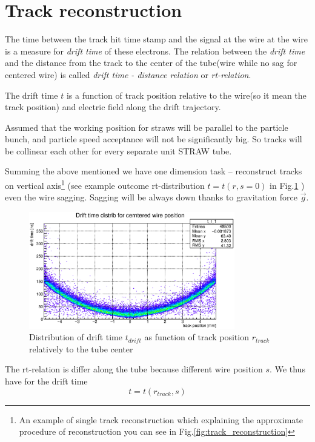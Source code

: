 \documentclass[]{article}
\begin{document}
	
	\section{Track reconstruction}
	
	 The time between the track hit time stamp and the signal at the wire at the wire is a measure for {\it drift time} of these electrons. The relation between the   {\it drift time} and  the distance from the track to the center of the tube(wire while no sag for centered wire) is called {\it drift time - distance relation} or {\it rt-relation}.
	
	The drift time $t$ is a function of track position relative to the wire(so it mean the track position) and electric field along the drift trajectory.
	
	Assumed that the working  position  for straws will be parallel to the particle bunch, and particle speed acceptance will not be significantly big. So tracks will be collinear each other for every separate unit STRAW tube.
	
	Summing the above mentioned we have one dimension task -- reconstruct tracks on vertical axis\footnote{An example of single track reconstruction which explaining the approximate procedure of reconstruction you can see in Fig.\ref{fig:track_reconstruction}}
	(see example outcome rt-distribution $t = t(r,s=0)$ in Fig.\ref{fig:t_r_distr_00} ) even the wire sagging. Sagging will be always down thanks to gravitation force $\vec{g}$.
	
	\begin{figure}[h]
	\includegraphics[width=0.8\textwidth]{t_r_distr_00.eps}
	\centering
	\caption{ Distribution of drift time $t_{drift}$ as function of track position $r_{track}$ relatively to the tube center} 
	\label{fig:t_r_distr_00}
	\end{figure}
		
	The rt-relation is differ along the tube because different wire position $s$. We thus have for the drift time 
	\begin{equation}
	t = t(r_{track},s)
	\end{equation}
	
\end{document}
